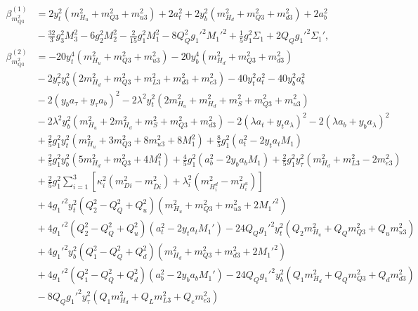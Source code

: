 \documentclass[preprint,amsmath,amssymb,aps,superscriptaddress,prd,showpacs,floatfix,nofootinbib]{revtex4-1}
\begin{document}
\begin{subequations}
\begin{align}
\beta_{m_{Q3}^2}^{(1)}&=2y_t^2\left ( m_{H_u}^2+m_{Q3}^2+m_{u3}^2\right )+2a_t^2+2y_b^2\left ( m_{H_d}^2+m_{Q3}^2+m_{d3}^2\right )+2a_b^2\nonumber\\
&{}-\frac{32}{3}g_3^2M_3^2-6g_2^2M_2^2-\frac{2}{15}g_1^2M_1^2-8Q_Q^2g_1'^2M_1'^2+\frac{1}{5}g_1^2\Sigma_1+2Q_Qg_1'^2\Sigma_1',\label{eq:USSMmq222BetaOneLoop}\\
\beta_{m_{Q3}^2}^{(2)}&=-20y_t^4\left ( m_{H_u}^2+m_{Q3}^2+m_{u3}^2 \right )-20y_b^4\left ( m_{H_d}^2+m_{Q3}^2+m_{d3}^2 \right )\nonumber\\
&{}-2y_\tau^2y_b^2\left ( 2m_{H_d}^2+m_{Q3}^2+m_{L3}^2+m_{d3}^2+m_{e3}^2\right )-40y_t^2a_t^2-40y_b^2a_b^2\nonumber\\
&{}-2\left ( y_ba_\tau+y_\tau a_b\right )^2-2\lambda^2y_t^2\left ( 2m_{H_u}^2+m_{H_d}^2+m_S^2+m_{Q3}^2+m_{u3}^2\right )\nonumber\\
&{}-2\lambda^2y_b^2\left ( m_{H_u}^2+2m_{H_d}^2+m_S^2+m_{Q3}^2+m_{d3}^2\right )-2\left ( \lambda a_t+y_t a_\lambda \right )^2-2\left ( \lambda a_b+y_b a_\lambda \right )^2\nonumber\\
&{}+\frac{2}{5}g_1^2y_t^2\left ( m_{H_u}^2+3m_{Q3}^2+8m_{u3}^2 +8M_1^2\right )+\frac{8}{5}g_1^2\left ( a_t^2-2y_ta_tM_1 \right )\nonumber\\
&{}+\frac{2}{5}g_1^2y_b^2\left ( 5m_{H_d}^2+m_{Q3}^2+4M_1^2\right )+\frac{4}{5}g_1^2\left ( a_b^2-2y_ba_bM_1 \right )+\frac{2}{5}g_1^2y_\tau^2\left ( m_{H_d}^2+m_{L3}^2-2m_{e3}^2\right )\nonumber\\
&{}+\frac{2}{5}g_1^2\sum_{i=1}^3\left [ \kappa_i^2\left ( m_{Di}^2-m_{\overline{D}i}^2\right )+\lambda_i^2\left ( m_{H_i^d}^2-m_{H_i^u}^2\right )\right ]\nonumber\\
&{}+4g_1'^2y_t^2\left ( Q_2^2-Q_Q^2+Q_u^2\right )\left ( m_{H_u}^2+m_{Q3}^2+m_{u3}^2+2M_1'^2\right )\nonumber\\
&{}+4g_1'^2\left ( Q_2^2-Q_Q^2+Q_u^2\right )\left ( a_t^2 -2y_ta_tM_1'\right )-24Q_Qg_1'^2y_t^2\left ( Q_2m_{H_u}^2+Q_Qm_{Q3}^2+Q_um_{u3}^2\right )\nonumber\\
&{}+4g_1'^2y_b^2\left ( Q_1^2-Q_Q^2+Q_d^2 \right )\left ( m_{H_d}^2+m_{Q3}^2+m_{d3}^2+2M_1'^2\right )\nonumber\\
&{}+4g_1'^2\left ( Q_1^2-Q_Q^2+Q_d^2\right )\left ( a_b^2-2y_ba_bM_1'\right )-24Q_Qg_1'^2y_b^2\left ( Q_1m_{H_d}^2+Q_Qm_{Q3}^2+Q_dm_{d3}^2\right )\nonumber\\
&{}-8Q_Qg_1'^2y_\tau^2\left ( Q_1m_{H_d}^2+Q_Lm_{L3}^2+Q_em_{e3}^2\right )\nonumber\\

\end{align}
\end{subequations}
\end{document}
